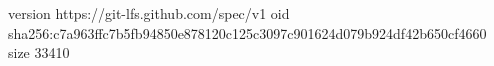 version https://git-lfs.github.com/spec/v1
oid sha256:c7a963ffc7b5fb94850e878120c125c3097c901624d079b924df42b650cf4660
size 33410
